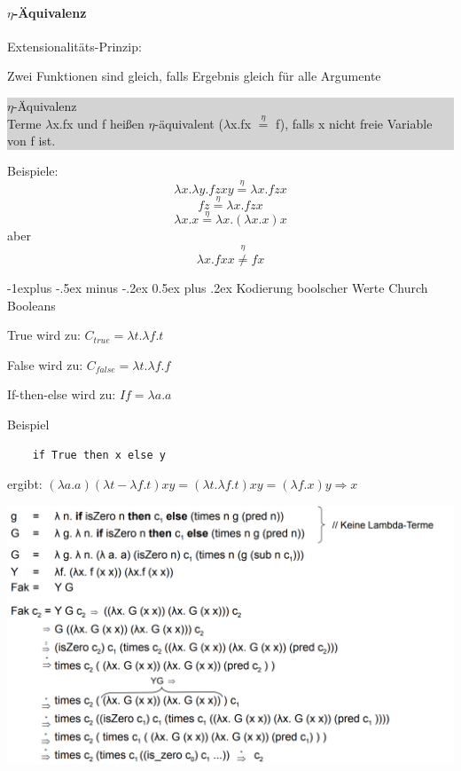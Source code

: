 \documentclass[10pt]{article}
\makeatletter
\renewcommand{\subsection}{\@startsection{subsection}{2}{0mm}%
                                {-1explus -.5ex minus -.2ex}%
                                {0.5ex plus .2ex}%
                                {\normalfont\normalsize\bfseries}}
\makeatother
\begin{document}
  \paragraph{$\eta$-Äquivalenz}
  
  Extensionalitäts-Prinzip: 
  \begin{itemize*}
    \item Zwei Funktionen sind gleich, falls Ergebnis gleich für alle Argumente
  \end{itemize*}
  \colorbox{lightgray} {
    \begin{minipage}[h]{1.0\linewidth}
      $\eta$-Äquivalenz \\
      Terme $\lambda$x.fx und f heißen $\eta$-äquivalent ($\lambda$x.fx $\stackrel{\eta}{=}$ f), falls x nicht freie Variable von f ist.
    \end{minipage}
  }
  
  Beispiele:
  $$\lambda x.\lambda y.f z x y \stackrel{\eta}{=}\lambda x.f z x$$
  $$f z \stackrel{\eta}{=}\lambda x.f z x$$
  $$\lambda x.x \stackrel{\eta}{=}\lambda x.(\lambda x.x)x$$
  aber $$\lambda x.f x x \stackrel{\eta}{\neq} f x$$
  
  \subsection{Kodierung boolscher Werte}
  Church Booleans
  \begin{itemize*}
    \item True wird zu: $C_{true} = \lambda t.\lambda f.t$
    \item False wird zu: $C_{false} = \lambda t.\lambda f.f$
    \item If-then-else wird zu: $If = \lambda a.a$
  \end{itemize*}
  
  Beispiel
  \begin{lstlisting}
    if True then x else y
\end{lstlisting}
  ergibt: $(\lambda a.a)(\lambda t- \lambda f.t) x y = (\lambda t.\lambda f.t) xy = (\lambda f.x)y \Rightarrow x$

  \begin{center}
    \includegraphics[width=0.4\linewidth]{Assets/Programmierparadigmen-Lambda_Abstraktion.png}
  \end{center}
  
\end{document}
